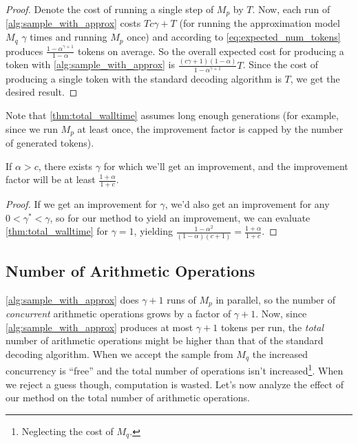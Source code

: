 \begin{proof}
Denote the cost of running a single step of $M_p$ by $T$. Now, each run of \ref{alg:sample_with_approx} costs $Tc\gamma + T$ (for running the approximation model $M_q$ $\gamma$ times and running $M_p$ once) and according to \ref{eq:expected_num_tokens} produces $\frac{1 - \alpha^{\gamma + 1}}{1 - \alpha}$ tokens on average. So the overall expected cost for producing a token with \ref{alg:sample_with_approx} is $\frac{(c\gamma + 1)(1-\alpha)}{1 - \alpha^{\gamma + 1}}T$. Since the cost of producing a single token with the standard decoding algorithm is $T$, we get the desired result.
\end{proof}

Note that \ref{thm:total_walltime} assumes long enough generations (for example, since we run $M_p$ at least once, the improvement factor is capped by the number of generated tokens).

\begin{corollary}
\label{lemma:condition_for_improvement}
If $\alpha > c$, there exists $\gamma$ for which we'll get an improvement, and the improvement factor will be at least $\frac{1 + \alpha}{1 + c}$.
\end{corollary}

\begin{proof}
If we get an improvement for $\gamma$, we’d also get an improvement for any $0 < \gamma^* < \gamma$, so for our method to yield an improvement, we can evaluate \ref{thm:total_walltime} for $\gamma=1$, yielding $\frac{1 - \alpha^2}{(1-\alpha)(c + 1)} = \frac{1 + \alpha}{1 + c}$.
\end{proof}

\subsection{Number of Arithmetic Operations}
\label{sec:arithmetic_ops}

\ref{alg:sample_with_approx} does $\gamma + 1$ runs of $M_p$ in parallel, so the number of \emph{concurrent} arithmetic operations grows by a factor of $\gamma + 1$. Now, since \ref{alg:sample_with_approx} produces at most $\gamma + 1$ tokens per run, the \emph{total} number of arithmetic operations might be higher than that of the standard decoding algorithm. When we accept the sample from $M_q$ the increased concurrency is ``free'' and the total number of operations isn't increased\footnote{Neglecting the cost of $M_q$.}. When we reject a guess though, computation is wasted. Let's now analyze the effect of our method on the total number of arithmetic operations.


